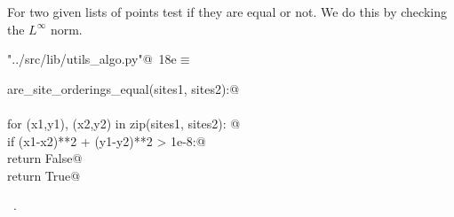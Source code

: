 \documentclass[11.5pt]{report}
\begin{document}
\vspace{-0.8cm}
\newchunk For two given lists of points test if they are 
equal or not. We do this by checking the $L^{\infty}$ norm.
\begin{flushleft} \small
\begin{minipage}{\linewidth}\label{scrap17}\raggedright\small
{} \verb@"../src/lib/utils_algo.py"@\nobreak\ {\footnotesize {18e}}$\equiv$
\vspace{-1ex}
\begin{list}{}{} \item
\mbox{}\verb@def are_site_orderings_equal(sites1, sites2):@\\
\mbox{}\verb@@\\
\mbox{}\verb@    for (x1,y1), (x2,y2) in zip(sites1, sites2): @\\
\mbox{}\verb@        if (x1-x2)**2 + (y1-y2)**2 > 1e-8:@\\
\mbox{}\verb@            return False@\\
\mbox{}\verb@    return True@\\
\mbox{}\verb@@{\NWsep}
\end{list}
\vspace{-1.5ex}
\footnotesize
\begin{list}{}{\setlength{\itemsep}{-\parsep}\setlength{\itemindent}{-\leftmargin}}
\item \NWtxtFileDefBy\ .

\item{}
\end{list}
\end{minipage}\vspace{4ex}
\end{flushleft}
\end{document}
